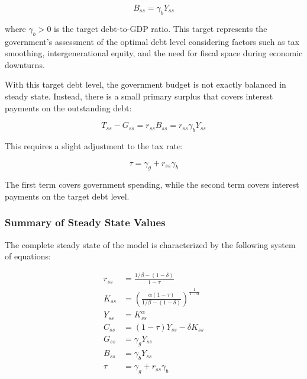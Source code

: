 \documentclass[5p,authoryear]{elsarticle}
\begin{document}
\begin{equation}
B_{ss} = \gamma_b Y_{ss}
\label{eq:ss_debt_target}
\end{equation}

where $\gamma_b > 0$ is the target debt-to-GDP ratio. This target represents the government's assessment of the optimal debt level considering factors such as tax smoothing, intergenerational equity, and the need for fiscal space during economic downturns.

With this target debt level, the government budget is not exactly balanced in steady state. Instead, there is a small primary surplus that covers interest payments on the outstanding debt:

\begin{equation}
T_{ss} - G_{ss} = r_{ss} B_{ss} = r_{ss} \gamma_b Y_{ss}
\label{eq:ss_primary_surplus}
\end{equation}

This requires a slight adjustment to the tax rate:

\begin{equation}
\tau = \gamma_g + r_{ss} \gamma_b
\label{eq:ss_tax_rate}
\end{equation}

The first term covers government spending, while the second term covers interest payments on the target debt level.

\subsubsection{Summary of Steady State Values}

The complete steady state of the model is characterized by the following system of equations:

\begin{align}
r_{ss} &= \frac{1/\beta - (1-\delta)}{1-\tau} \label{eq:ss_summary_rental} \\
K_{ss} &= \left( \frac{\alpha(1-\tau)}{1/\beta - (1-\delta)} \right)^{\frac{1}{1-\alpha}} \label{eq:ss_summary_capital} \\
Y_{ss} &= K_{ss}^{\alpha} \label{eq:ss_summary_output} \\
C_{ss} &= (1-\tau) Y_{ss} - \delta K_{ss} \label{eq:ss_summary_consumption} \\
G_{ss} &= \gamma_g Y_{ss} \label{eq:ss_summary_government} \\
B_{ss} &= \gamma_b Y_{ss} \label{eq:ss_summary_debt} \\
\tau &= \gamma_g + r_{ss} \gamma_b \label{eq:ss_summary_tax}
\end{align}
\end{document}
